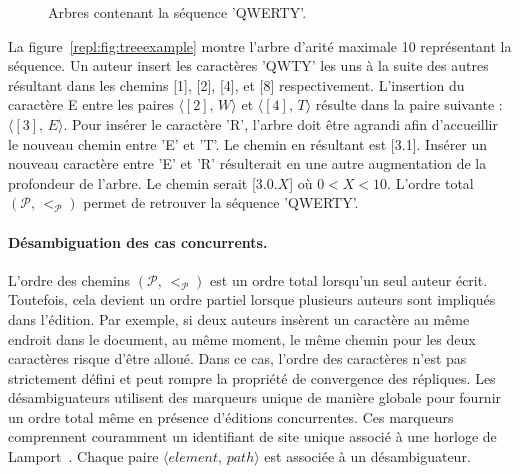 \begin{figure}
  \centering
  \hspace{20pt}
  \caption{Arbres contenant la séquence 'QWERTY'.}
\end{figure}

La figure~\ref{repl:fig:treeexample} montre l'arbre d'arité maximale 10
représentant la séquence. Un auteur insert les caractères 'QWTY' les uns à la
suite des autres résultant dans les chemins [1], [2], [4], et [8]
respectivement. L'insertion du caractère E entre les paires
$\langle [2],\,W \rangle$ et $\langle [4],\, T \rangle$ résulte dans la paire
suivante : $\langle [3],\, E \rangle$. Pour insérer le caractère 'R', l'arbre
doit être agrandi afin d'accueillir le nouveau chemin entre 'E' et 'T'. Le
chemin en résultant est [3.1]. Insérer un nouveau caractère entre 'E' et 'R'
résulterait en une autre augmentation de la profondeur de l'arbre. Le chemin
serait [3.0.$X$] où $0<X<10$. L'ordre total $(\mathcal{P},\, <_\mathcal{P})$
permet de retrouver la séquence 'QWERTY'.


\paragraph{Désambiguation des cas concurrents.}

L'ordre des chemins $(\mathcal{P},\, <_\mathcal{P})$ est un ordre total
lorsqu'un seul auteur écrit. Toutefois, cela devient un ordre partiel lorsque
plusieurs auteurs sont impliqués dans l'édition. Par exemple, si deux auteurs
insèrent un caractère au même endroit dans le document, au même moment, le même
chemin pour les deux caractères risque d'être alloué. Dans ce cas, l'ordre des
caractères n'est pas strictement défini et peut rompre la propriété de
convergence des répliques. Les désambiguateurs utilisent des marqueurs unique de
manière globale pour fournir un ordre total même en présence d'éditions
concurrentes. Ces marqueurs comprennent couramment un identifiant de site unique
associé à une horloge de Lamport~\cite{lamport1978time}. Chaque paire
$\langle element,\, path\rangle$ est associée à un désambiguateur.

